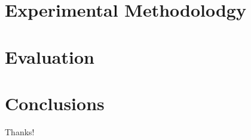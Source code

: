 \documentclass[10pt]{beamer}
\begin{document}
\section{Experimental Methodolodgy}

\section{Evaluation}

\section{Conclusions}

\begin{frame}[standout] 
    \huge \textlatin{Thanks!}
\end{frame}
\end{document}
